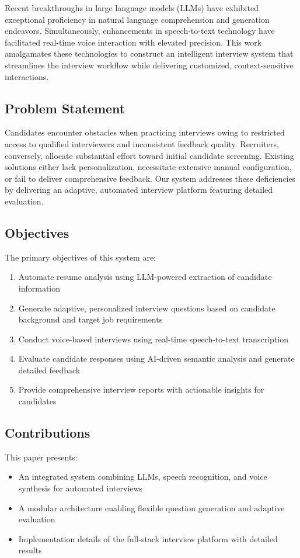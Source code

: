 \documentclass[conference]{IEEEtran}
\begin{document}
Recent breakthroughs in large language models (LLMs) have exhibited exceptional proficiency in natural language comprehension and generation endeavors. Simultaneously, enhancements in speech-to-text technology have facilitated real-time voice interaction with elevated precision. This work amalgamates these technologies to construct an intelligent interview system that streamlines the interview workflow while delivering customized, context-sensitive interactions.

\subsection{Problem Statement}

Candidates encounter obstacles when practicing interviews owing to restricted access to qualified interviewers and inconsistent feedback quality. Recruiters, conversely, allocate substantial effort toward initial candidate screening. Existing solutions either lack personalization, necessitate extensive manual configuration, or fail to deliver comprehensive feedback. Our system addresses these deficiencies by delivering an adaptive, automated interview platform featuring detailed evaluation.

\subsection{Objectives}

The primary objectives of this system are:
\begin{enumerate}
\item Automate resume analysis using LLM-powered extraction of candidate information
\item Generate adaptive, personalized interview questions based on candidate background and target job requirements
\item Conduct voice-based interviews using real-time speech-to-text transcription
\item Evaluate candidate responses using AI-driven semantic analysis and generate detailed feedback
\item Provide comprehensive interview reports with actionable insights for candidates
\end{enumerate}

\subsection{Contributions}

This paper presents:
\begin{itemize}
\item An integrated system combining LLMs, speech recognition, and voice synthesis for automated interviews
\item A modular architecture enabling flexible question generation and adaptive evaluation
\item Implementation details of the full-stack interview platform with detailed results
\end{itemize}
\end{document}
